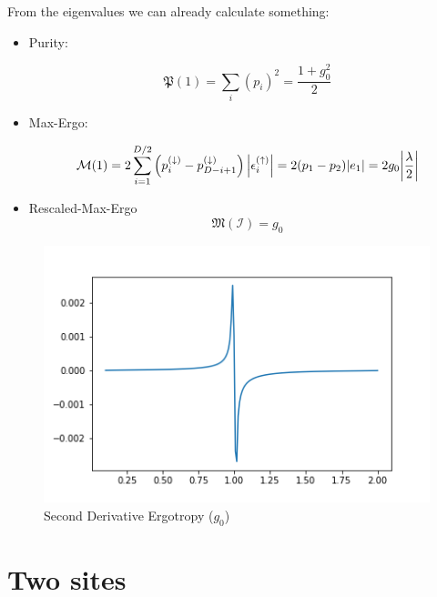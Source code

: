 \documentclass[12pt,a4paper]{report}
\begin{document}
From the eigenvalues we can already calculate something:
\begin{itemize}
	\item Purity: 
	
	\begin{equation}
		\mathfrak{P}(1)=\sum_{i}\left(p_{i}\right)^{2}=\frac{1+g_0^2}{2}
	\end{equation}
	\item Max-Ergo:
	
	\begin{equation}
		\mathcal{M}(1)=2 \sum_{i=1}^{D / 2}\left(p_{i}^{(\downarrow)}-p_{D-i+1}^{(\downarrow)}\right)\left|\epsilon_{i}^{(\uparrow)}\right|=2(p_1-p_2)\abs{e_1}=2g_0\abs{\frac{\lambda}{2}}
	\end{equation}
	\item Rescaled-Max-Ergo
	\begin{equation}
		\mathfrak{M}(\mathcal{I})=g_0
	\end{equation}	
	
\end{itemize}
\begin{figure}[h]
	\centering
	\includegraphics[width=0.7\linewidth]{one_site_secdev}
	\caption{Second Derivative Ergotropy ($g_0$)}
	\label{fig:onesitesecdev}
\end{figure}

\section{Two sites}
\end{document}
